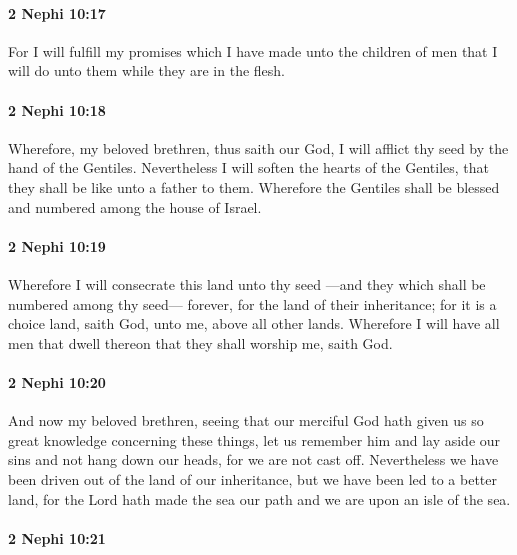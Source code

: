 		\paragraph{2 Nephi 10:17} %
			\label{2NEPHI-10-17}

			For I will fulfill my promises which I have made unto the children of men
			that I will do unto them while they are in the flesh.

		\paragraph{2 Nephi 10:18} %
			\label{2NEPHI-10-18}

			Wherefore, my beloved brethren, thus saith our God,
			I will afflict thy seed by the hand of the Gentiles.
			Nevertheless I will soften the hearts of the Gentiles,
			that they shall be like unto a father to them.
			Wherefore the Gentiles shall be blessed and numbered among the house of Israel.

		\paragraph{2 Nephi 10:19} %
			\label{2NEPHI-10-19}

			Wherefore I will consecrate this land unto thy seed
			---and they which shall be numbered among thy seed---
			forever, for the land of their inheritance;
			for it is a choice land, saith God, unto me,
			above all other lands.
			Wherefore I will have all men that dwell thereon
			that they shall worship me, saith God.

		\paragraph{2 Nephi 10:20} %
			\label{2NEPHI-10-20}

			And now my beloved brethren,
			seeing that our merciful God hath given us
			so great knowledge concerning these things,
			let us remember him and lay aside our sins and not hang down our heads,
			for we are not cast off.
			Nevertheless we have been driven out of the land of our inheritance,
			but we have been led to a better land,
			for the Lord hath made the sea our path
			and we are upon an isle of the sea.

		\paragraph{2 Nephi 10:21} %
			\label{2NEPHI-10-21}

